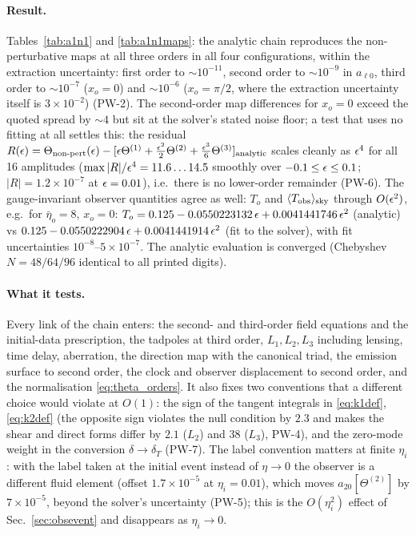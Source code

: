 \paragraph{Result.}  Tables~\ref{tab:a1n1} and \ref{tab:a1n1maps}: the analytic chain reproduces the non-perturbative maps at all three
orders in all four configurations, within the extraction uncertainty: first order to $\sim10^{-11}$, second order to $\sim10^{-9}$ in $a_{\ell0}$,
third order to $\sim10^{-7}$ ($x_o=0$) and $\sim10^{-6}$ ($x_o=\pi/2$, where the extraction uncertainty itself is $3\times10^{-2}$) (PW-2).  The second-order
map differences for $x_o=0$ exceed the quoted spread by $\sim4$ but sit at the solver's stated noise floor; a test that uses no fitting at all
settles this: the residual $R(\epsilon)=\Theta_{\rm non\text{-}pert}(\epsilon)-[\epsilon\Theta^{(1)}+\tfrac{\epsilon^2}2\Theta^{(2)}+\tfrac{\epsilon^3}6\Theta^{(3)}]_{\rm analytic}$ scales cleanly
as $\epsilon^4$ for all 16 amplitudes ($\max|R|/\epsilon^4=11.6\ldots14.5$ smoothly over $-0.1\le\epsilon\le0.1$; $|R|=1.2\times10^{-7}$ at $\epsilon=0.01$), i.e.\ there is
no lower-order remainder (PW-6).  The gauge-invariant observer quantities agree as well: $T_o$ and $\langle T_{\rm obs}\rangle_{\rm sky}$ through $O(\epsilon^2)$, e.g.\ for
$\bar\eta_o=8$, $x_o=0$: $T_o=0.125-0.0550223132\,\epsilon+0.0041441746\,\epsilon^2$ (analytic) vs $0.125-0.0550222904\,\epsilon+0.0041441914\,\epsilon^2$ (fit to the
solver), with fit uncertainties $10^{-8}$--$5\times10^{-7}$.  The analytic evaluation is converged (Chebyshev $N=48/64/96$ identical to all printed digits).

\paragraph{What it tests.}  Every link of the chain enters: the second- and third-order field equations and the initial-data prescription,
the tadpoles at third order, $L_1,L_2,L_3$ including lensing, time delay, aberration, the direction map with the canonical triad, the
emission surface to second order, the clock and observer displacement to second order, and the normalisation \eqref{eq:theta_orders}.  It
also fixes two conventions that a different choice would violate at $O(1)$: the sign of the tangent integrals in \eqref{eq:k1def},
\eqref{eq:k2def} (the opposite sign violates the null condition by $2.3$ and makes the shear and direct forms differ by $2.1$ ($L_2$) and $38$
($L_3$), PW-4), and the zero-mode weight in the conversion $\delta\to\delta_T$ (PW-7).  The label convention matters at finite $\eta_i$: with the
label taken at the initial event instead of $\eta\to0$ the observer is a different fluid element (offset $1.7\times10^{-5}$ at $\eta_i=0.01$), which
moves $a_{20}[\Theta^{(2)}]$ by $7\times10^{-5}$, beyond the solver's uncertainty (PW-5); this is the $O(\eta_i^2)$ effect of Sec.~\ref{sec:obsevent}
and disappears as $\eta_i\to0$.

